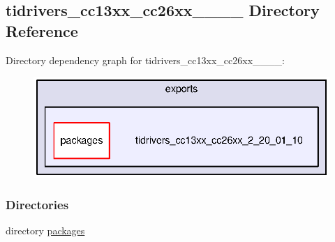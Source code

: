 \subsection{tidrivers\+\_\+cc13xx\+\_\+cc26xx\+\_\+\_\+\_\+\_ Directory Reference}
\label{dir_4427812c34aba6ec99f39f8627c59ccf}
Directory dependency graph for tidrivers\+\_\+cc13xx\+\_\+cc26xx\+\_\+\_\+\_\+\_\+:
\nopagebreak
\begin{figure}[H]
\begin{center}
\leavevmode
\includegraphics[width=345pt]{dir_4427812c34aba6ec99f39f8627c59ccf_dep}
\end{center}
\end{figure}
\subsubsection*{Directories}
\begin{DoxyCompactItemize}
\item 
directory \hyperlink{dir_f390b8b0184fdc524e4e5d621b62d714}{packages}
\end{DoxyCompactItemize}
